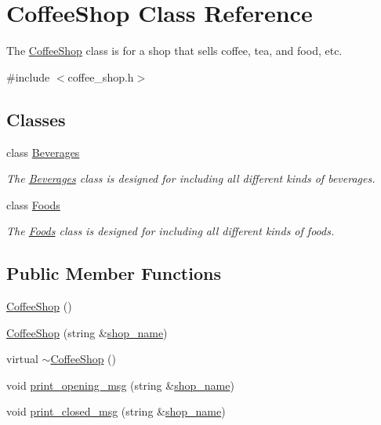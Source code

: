 \hypertarget{classCoffeeShop}{}\section{Coffee\+Shop Class Reference}
\label{classCoffeeShop}


The \hyperlink{classCoffeeShop}{Coffee\+Shop} class is for a shop that sells coffee, tea, and food, etc.  




{\ttfamily \#include $<$coffee\+\_\+shop.\+h$>$}

\subsection*{Classes}
\begin{DoxyCompactItemize}
\item 
class \hyperlink{classCoffeeShop_1_1Beverages}{Beverages}
\begin{DoxyCompactList}\small\item\em The \hyperlink{classCoffeeShop_1_1Beverages}{Beverages} class is designed for including all different kinds of beverages. \end{DoxyCompactList}\item 
class \hyperlink{classCoffeeShop_1_1Foods}{Foods}
\begin{DoxyCompactList}\small\item\em The \hyperlink{classCoffeeShop_1_1Foods}{Foods} class is designed for including all different kinds of foods. \end{DoxyCompactList}\end{DoxyCompactItemize}
\subsection*{Public Member Functions}
\begin{DoxyCompactItemize}
\item 
\hyperlink{classCoffeeShop_a1df367182e9a66e6dda688d0db969783}{Coffee\+Shop} ()
\item 
\hyperlink{classCoffeeShop_a017c047d9f3fd3395e72a58105acd32b}{Coffee\+Shop} (string \&\hyperlink{classCoffeeShop_ad6efd0c2040c9fd470e2e837b27547e4}{shop\+\_\+name})
\item 
virtual \hyperlink{classCoffeeShop_a7ef2b143bc94d1a65b656d43affaff90}{$\sim$\+Coffee\+Shop} ()
\item 
void \hyperlink{classCoffeeShop_a608385ea580654a679fd94dbf906d569}{print\+\_\+opening\+\_\+msg} (string \&\hyperlink{classCoffeeShop_ad6efd0c2040c9fd470e2e837b27547e4}{shop\+\_\+name})
\item 
void \hyperlink{classCoffeeShop_a4ef0961e1d6a6184e7c1ebc44932d874}{print\+\_\+closed\+\_\+msg} (string \&\hyperlink{classCoffeeShop_ad6efd0c2040c9fd470e2e837b27547e4}{shop\+\_\+name})
\end{DoxyCompactItemize}
